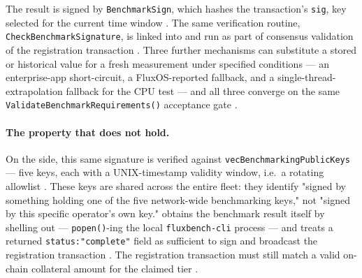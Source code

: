 The result is signed by \texttt{BenchmarkSign}, which hashes the transaction's \texttt{sig},
key selected for the current time window
\shipped {}. The same verification routine,
\texttt{Check\allowbreak{}Benchmark\allowbreak{}Signature}, is linked into \fluxd and run as part of consensus validation of the
registration transaction \shipped {}. Three
further mechanisms can substitute a stored or historical value for a fresh measurement under specified
conditions — an enterprise-app short-circuit, a FluxOS-reported fallback, and a
single-thread-extrapolation fallback for the CPU test — and all three converge on the same
\texttt{Validate\allowbreak{}Benchmark\allowbreak{}Requirements()} acceptance gate
\shipped {}.

\paragraph{The property that does not hold.} On the \fluxd side, this same signature is verified
against \texttt{vec\allowbreak{}Benchmarking\allowbreak{}Public\allowbreak{}Keys} — five keys, each with a UNIX-timestamp validity window,
i.e.\ a rotating allowlist \shipped {}. These keys are
shared across the entire fleet: they identify "signed by something holding one of the five
network-wide benchmarking keys," not "signed by this specific operator's own key." \fluxd obtains the
benchmark result itself by shelling out — \texttt{popen()}-ing the local \texttt{fluxbench-cli}
process — and treats a returned \texttt{status:\allowbreak{}"complete"} field as sufficient to sign and broadcast
the registration transaction \shipped {}.
The registration transaction must still match a valid on-chain collateral amount for the claimed tier
\shipped {}.

